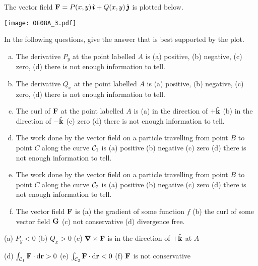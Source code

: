 \begin{question}[M317 2008A] %
The vector field
$\mathbf{F} = P (x, y)\,\hat{\pmb{\imath}} + Q(x, y)\,\hat{\pmb{\jmath}}$
is plotted below. 

\begin{center}
       \texttt{[image: OE08A\_3.pdf]}
\end{center}


In the following questions, give the answer that 
is best supported by the plot.
\begin{enumerate}[(a)]
\item
The derivative $P_y$ at the point labelled $A$ is 
   (a) positive, (b) negative, (c) zero, 
   (d) there is not enough information to tell.
\item
The derivative $Q_x$ at the point labelled $A$ is 
    (a) positive, (b) negative, (c) zero, 
    (d) there is not enough information to tell.
\item
The curl of $\mathbf{F}$ at the point labelled $A$ is 
     (a) in the direction of $+\hat{\mathbf{k}}$ 
     (b) in the direction of $-\hat{\mathbf{k}}$ 
     (c) zero (d) there is not enough information to tell.
\item
The work done by the vector field on a particle travelling from point 
$B$ to point $C$ along the curve $\mathcal{C}_1$ is 
    (a) positive (b) negative (c) zero 
    (d) there is not enough information to tell.
\item
The work done by the vector field on a particle travelling from point 
$B$ to point $C$ along the curve $\mathcal{C}_2$ is 
    (a) positive (b) negative (c) zero 
    (d) there is not enough information to tell.
\item
The vector field $\mathbf{F}$ is 
    (a) the gradient of some function $f$ 
    (b) the curl of some vector field $\mathbf{G}$ 
    (c) not conservative 
    (d) divergence free.
\end{enumerate}
\end{question}

%


\begin{answer} 
(a) $P_y<0$ \qquad
(b) $Q_x>0$ \qquad
(c) $\vnabla\times\vF$ is in the direction of $+\hat{\mathbf{k}}$ at $A$

(d) $\int_{\mathcal{C}_1}\mathbf{F}\cdot\mathrm{d}\mathbf{r}>0$\qquad
(e) $\int_{\mathcal{C}_2}\mathbf{F}\cdot\mathrm{d}\mathbf{r}<0$\qquad
(f) $\mathbf{F}$ is not conservative
\end{answer}

